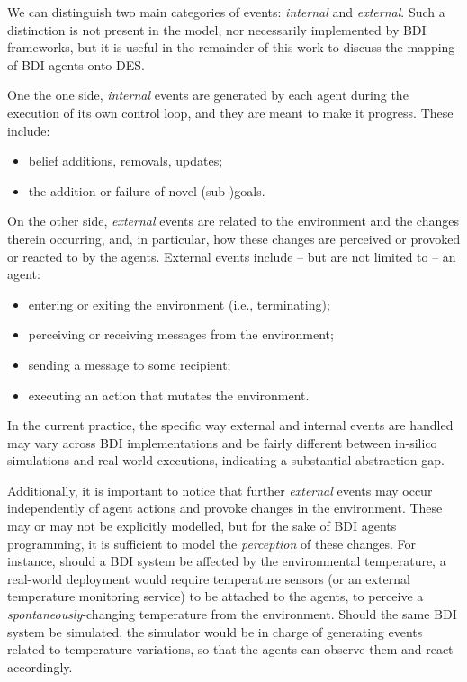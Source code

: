 We can distinguish two main categories of events: \emph{internal} and \emph{external}.
Such a distinction is not present in the \agentspeak{} model,
nor necessarily implemented by \ac{BDI} frameworks,
but it is useful in the remainder of this work to discuss the mapping of \ac{BDI} agents onto \ac{DES}.

One the one side,
\emph{internal} events are generated by each agent during the execution of its own control loop,
and they are meant to make it progress.
%
These include:
\begin{itemize}
    \item belief additions, removals, updates;%
    \item the addition or failure of novel (sub-)goals.
\end{itemize}

On the other side,
\emph{external} events
are related to the environment and the changes therein occurring,
and, in particular,
how these changes are perceived or provoked or reacted to by the agents.
%
External events include -- but are not limited to -- an agent:
\begin{itemize}
    \item entering or exiting the environment (i.e., terminating);
    \item\label{item:percepts} perceiving or receiving messages from the environment;
    \item sending a message to some recipient;
    \item executing an action that mutates the environment.
\end{itemize}

In the current practice,
the specific way external and internal events are handled
may vary across \ac{BDI} implementations
and be fairly different between in-silico simulations and real-world executions,
indicating a substantial abstraction gap.

Additionally, it is important to notice that
further \emph{external} events may occur independently of agent actions
and provoke changes in the environment.
These may or may not be explicitly modelled,
but for the sake of \ac{BDI} agents programming,
it is sufficient to model the \emph{perception} of these changes.
%
For instance,
should a \ac{BDI} system be affected by the environmental temperature,
a real-world deployment would require temperature sensors
(or an external temperature monitoring service)
to be attached to the agents,
to perceive a \emph{spontaneously}-changing temperature from the environment.
%
Should the same \ac{BDI} system be simulated,
the simulator would be in charge of generating events related to temperature variations,
so that the agents can observe them and react accordingly.


